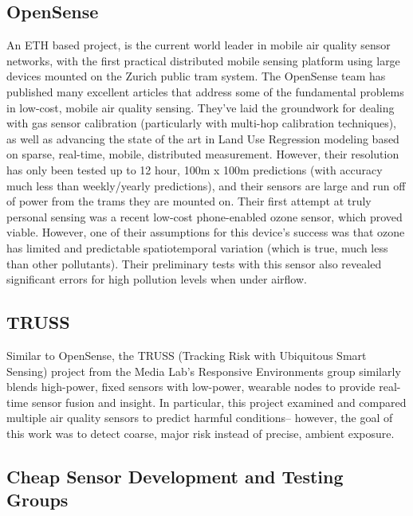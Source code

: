 \subsection{OpenSense} 

An ETH based project, is the current world leader in mobile air quality sensor networks, with the first practical distributed mobile sensing platform using large devices mounted on the Zurich public tram system. \cite{hasen2011}  The OpenSense team has published many excellent articles that address some of the fundamental problems in low-cost, mobile air quality sensing.  They've laid the groundwork for dealing with gas sensor calibration (particularly with multi-hop calibration techniques), as well as advancing the state of the art in Land Use Regression modeling based on sparse, real-time, mobile, distributed measurement.  However, their resolution has only been tested up to 12 hour, 100m x 100m predictions (with accuracy much less than weekly/yearly predictions), and their sensors are large and run off of power from the trams they are mounted on. Their first attempt at truly personal sensing was a recent low-cost phone-enabled ozone sensor, which proved viable. \cite{hansen2012_2}  However, one of their assumptions for this device's success was that ozone has limited and predictable spatiotemporal variation (which is true, much less than other pollutants). Their preliminary tests with this sensor also revealed significant errors for high pollution levels when under airflow. \cite{hasen2014, hasen2012, saukh2015}
	
\subsection{TRUSS}

Similar to OpenSense, the TRUSS (Tracking Risk with Ubiquitous Smart Sensing) project from the Media Lab's Responsive Environments group similarly blends high-power, fixed sensors with low-power, wearable nodes to provide real-time sensor fusion and insight. \cite{truss}  In particular, this project examined and compared multiple air quality sensors to predict harmful conditions-- however, the goal of this work was to detect coarse, major risk instead of precise, ambient exposure.

\subsection{Cheap Sensor Development and Testing Groups}

